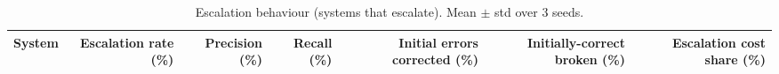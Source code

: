 \begin{table}[t]
\centering
\small
\caption{Escalation behaviour (systems that escalate). Mean $\pm$ std over 3 seeds.}
\label{tab:escalation}
\begin{tabular}{lrrrrrr}
\toprule
System & Escalation rate (\%) & Precision (\%) & Recall (\%) & Initial errors corrected (\%) & Initially-correct broken (\%) & Escalation cost share (\%) \\
\midrule
\bottomrule
\end{tabular}
\end{table}
